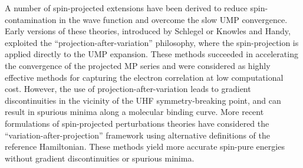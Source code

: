 \documentclass[aps,prb,reprint,noshowkeys,linenumbers,superscriptaddress]{revtex4-1}
\newcommand{\latin}[1]{#1}
\newcommand{\ie}{\latin{i.e.}}
\begin{document}
A number of spin-projected extensions have been derived to reduce spin-contamination in the wave function
and overcome the slow UMP convergence.
Early versions of these theories, introduced by Schlegel \cite{Schlegel_1986, Schlegel_1988} or 
Knowles and Handy,\cite{Knowles_1988a,Knowles_1988b} exploited the ``projection-after-variation'' philosophy,
where the spin-projection is applied directly to the UMP expansion.
These methods succeeded in accelerating the convergence of the projected MP series and were 
considered as highly effective methods for capturing the electron correlation at low computational cost.\cite{Knowles_1988b}
However, the use of projection-after-variation leads to gradient discontinuities in the vicinity of the UHF symmetry-breaking point,
and can result in spurious minima along a molecular binding curve.\cite{Schlegel_1986,Knowles_1988a}
More recent formulations of spin-projected perturbations theories have considered the  
``variation-after-projection'' framework using alternative definitions of the reference 
Hamiltonian.\cite{Tsuchimochi_2014,Tsuchimochi_2019}
These methods yield more accurate spin-pure energies without 
gradient discontinuities or spurious minima.

\end{document}
